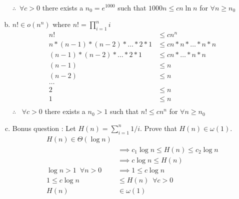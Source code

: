 \documentclass[12pt]{article}
\begin{document}
\begin{enumerate}[(a)]
\begin{align*}
\end{align*}
$\therefore \enspace \forall c > 0$ there exists a $n_{0} = e^{1000}$ such that $1000n \leq cn \ln n$ for  $\forall n \geq n_{0}$
\item $n ! \in o(n^{n})$ where $n ! = \prod_{i=1}^n i$
\begin{align*}
n! &\leq cn^n\\
n*(n-1)*(n-2)* \dots *2*1 &\leq cn*n*\dots *n*n\\
(n-1)*(n-2)* \dots *2*1 &\leq cn*\dots *n*n\\ 
(n-1)&\leq n\\
(n-2)&\leq n\\
\dots &\\
2 &\leq n\\
1 &\leq n\\
\end{align*}
$\therefore$ $\enspace \forall c > 0$ there exists a $n_{0} >1 $ such that $n ! \leq cn^{n}$ for  $\forall n \geq n_{0}$
\item Bonus question : Let $H(n) = \sum_{i=1}^n 1/i$. 
  Prove that $H(n) \in \omega (1) $.
\begin{align*}
H(n)\in \Theta (\log n)&\\
&\implies c_{1}\log n \leq H(n) \leq c_{2}\log n\\
&\implies c\log n \leq H(n) \\
\log n > 1 \enspace \forall n > 0 &\implies 1 \leq c\log n\\
1\leq c\log n &\leq H(n) \enspace \forall c > 0\\
H(n) &\in \omega(1)
\end{align*}
\end{enumerate}
\end{document}
